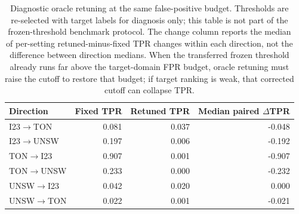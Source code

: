 \begin{table}[htbp]
\centering
\scriptsize
\setlength{\tabcolsep}{4pt}
\caption{Diagnostic oracle retuning at the same \FrozenFprTarget{} false-positive budget. Thresholds are re-selected with target labels for diagnosis only; this table is not part of the frozen-threshold benchmark protocol. The change column reports the median of per-setting retuned-minus-fixed TPR changes within each direction, not the difference between direction medians. When the transferred frozen threshold already runs far above the target-domain \FrozenFprTarget{} FPR budget, oracle retuning must raise the cutoff to restore that budget; if target ranking is weak, that corrected cutoff can collapse TPR.}
\label{tab:acsac-oracle-retuned}
\begin{tabular}{lrrr}
\toprule
Direction & Fixed TPR & Retuned TPR & Median paired $\Delta$TPR \\
\midrule
I23$\to$TON & 0.081 & 0.037 & -0.048 \\
I23$\to$UNSW & 0.197 & 0.006 & -0.192 \\
TON$\to$I23 & 0.907 & 0.001 & -0.907 \\
TON$\to$UNSW & 0.233 & 0.000 & -0.232 \\
UNSW$\to$I23 & 0.042 & 0.020 & 0.000 \\
UNSW$\to$TON & 0.022 & 0.001 & -0.021 \\
\bottomrule
\end{tabular}
\end{table}
